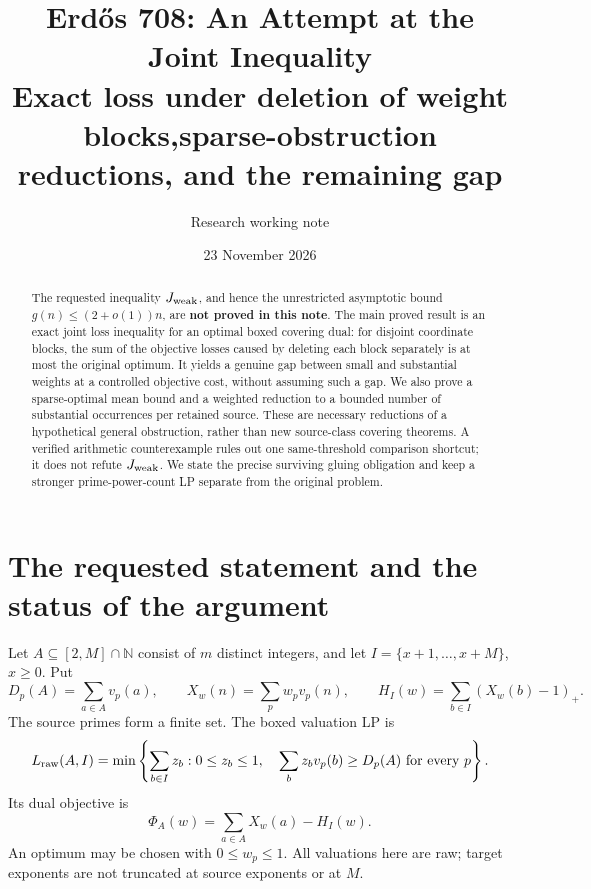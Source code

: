 \documentclass[11pt,a4paper]{article}
\title{Erd\H{o}s 708: An Attempt at the Joint Inequality\\
\large Exact loss under deletion of weight blocks,\newline sparse-obstruction reductions, and the remaining gap}
\author{Research working note}
\date{23 November 2026}
\theoremstyle{remark}\newtheorem{remark}[theorem]{Remark}
\newcommand{\pos}[1]{(#1)_+}
\newcommand{\LP}{L_{\rm raw}}
\begin{document}
\maketitle
\begin{abstract}
The requested inequality \(J_{\rm weak}\), and hence the unrestricted
asymptotic bound \(g(n)\le(2+o(1))n\), are \textbf{not proved in this note}.
The main proved result is an exact joint loss inequality for an optimal
boxed covering dual: for disjoint coordinate blocks, the sum of the
objective losses caused by deleting each block separately is at most the
original optimum. It yields a genuine gap between small and substantial
weights at a controlled objective cost, without assuming such a gap.
We also prove a sparse-optimal mean bound and a weighted reduction to a
bounded number of substantial occurrences per retained source. These are
necessary reductions of a hypothetical general obstruction, rather than
new source-class covering theorems. A verified arithmetic counterexample
rules out one same-threshold comparison shortcut; it does not refute
\(J_{\rm weak}\). We state the precise surviving gluing obligation and
keep a stronger prime-power-count LP separate from the original problem.
\end{abstract}
\tableofcontents

\section{The requested statement and the status of the argument}

Let \(A\subseteq[2,M]\cap\mathbb N\) consist of \(m\) distinct integers,
and let \(I=\{x+1,\ldots,x+M\}\), \(x\ge0\). Put
\[
 D_p(A)=\sum_{a\in A}v_p(a),\qquad
 X_w(n)=\sum_p w_pv_p(n),\qquad H_I(w)=\sum_{b\in I}\pos{X_w(b)-1}.
\]
The source primes form a finite set. The boxed valuation LP is
\begin{equation}
 \LP(A,I)=\min\left\{\sum_{b\in I}z_b:
 0\le z_b\le1,\quad\sum_bz_bv_p(b)\ge D_p(A)\ \text{for every }p\right\}.
 \label{eq:primal}
\end{equation}
Its dual objective is
\[
 \Phi_A(w)=\sum_{a\in A}X_w(a)-H_I(w).
\]
An optimum may be chosen with \(0\le w_p\le1\). All valuations here are
raw; target exponents are not truncated at source exponents or at \(M\).
\end{document}
